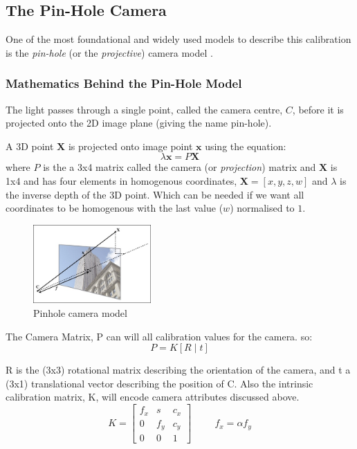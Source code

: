 \subsection {The Pin-Hole Camera}
One of the most foundational and widely used models to describe this calibration is the \emph{pin-hole} (or the  \emph{projective}) camera model \cite{solem2012programming}. 

\subsubsection{Mathematics Behind the Pin-Hole Model}
The light passes through a single point, called the camera centre, $C$, before it is projected onto the 2D image plane (giving the name pin-hole). 


A 3D point $\textbf{X}$ is projected onto image point $\textbf{x}$ using the equation:
\[\lambda \textbf{x} = P\textbf{X}\]
where $P$ is the a 3x4 matrix called the camera (or \emph{projection}) matrix and $\textbf{X}$ is 1x4 and has four elements in homogenous coordinates, \(\textbf{X} = [x, y, z, w]\) and $\lambda$ is the inverse depth of the 3D point. Which can be needed if we want all coordinates to be homogenous with the last value ($w$) normalised to $1$.

\begin{figure}[h]
  \centering
  \includegraphics[width=0.4\textwidth]{assets/background/pinhole-cam.jpg}
  \caption{Pinhole camera model \cite{solem2012programming}}\label{fig:pinhole}
\end{figure}

The Camera Matrix, P can will all calibration values for the camera. so:
\[P = K \left[R \mid t\right] \]


R is the (3x3) rotational matrix describing the orientation of the camera, and t a (3x1) translational vector describing the position of C.
Also the intrinsic calibration matrix, K, will encode camera attributes discussed above.
\[
  K = 
  \begin{bmatrix}
    f_x & s & c_x \\
    0 & f_y & c_y \\
    0 & 0 & 1
  \end{bmatrix}
  \hspace{1cm}
  f_x = \alpha f_y
\]

